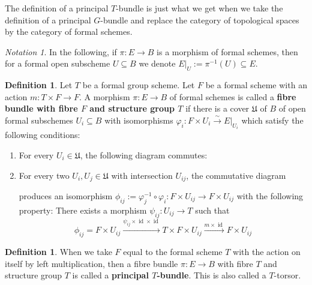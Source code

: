 \documentclass[11pt,oneside]{amsart}
\theoremstyle{definition}
\newtheorem{definition}[theorem]{Definition}
\theoremstyle{remark}
\newtheorem*{notation}{Notation}
\begin{document}
	
	The definition of a principal $T$-bundle is just what we get when we take the definition of a principal $G$-bundle and replace the category of topological spaces by the category of formal schemes.
	\begin{notation}
		In the following, if $\pi:E\rightarrow B$ is a morphism of formal schemes, then for a formal open subscheme $U\subseteq B$ we denote $E|_U:=\pi^{-1}(U)\subseteq E$.
	\end{notation}
	\begin{definition}\label{definition principal T-bundle}
		Let $T$ be a formal group scheme. Let $F$ be a formal scheme with an action $m:T\times F\rightarrow F$.
		A morphism $\pi:E\rightarrow B$ of formal schemes is called a \textbf{fibre bundle with fibre $F$ and structure group $T$} if there is a cover $\mathfrak U$ of $B$ of open formal subschemes $U_i\subseteq B$ with isomorphisms $\varphi_i:F\times U_i \xrightarrow{\sim} E|_{U_i}$ which satisfy the following conditions:
		\begin{enumerate}[label=(\alph*)]
			\item For every $U_i\in \mathfrak U$, the following diagram commutes:
			\begin{center}
			\end{center}
			\item For every two $U_i,U_j\in \mathfrak U$ with intersection $U_{ij}$, the commutative diagram
			\begin{center}
			\end{center}
			produces an isomorphism $\phi_{ij}:=\varphi_j^{-1}\circ\varphi_i: F\times U_{ij}\rightarrow F\times U_{ij}$ with the following property: There exists a morphism $\psi_{ij}:U_{ij}\rightarrow T$ such that
			\[\phi_{ij}=F\times U_{ij} \xrightarrow{\psi_{ij}\times \operatorname{id}\times\operatorname{id}} T\times F\times U_{ij}\xrightarrow{m\times \operatorname{id}} F\times U_{ij}\]
		\end{enumerate}
	\end{definition}
	\begin{definition}
		When we take $F$ equal to the formal scheme $T$ with the action on itself by left multiplication, then a fibre bundle $\pi:E\rightarrow B$ with fibre $T$ and structure group $T$ is called a \textbf{principal $T$-bundle}. This is also called a $T$-torsor.
	\end{definition}
	
\end{document}

